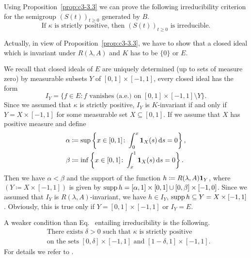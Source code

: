 \begin{examples}
\begin{enumerate}[\upshape (i), wide, labelindent=.25em]
	Using Proposition~\ref{prop:c3-3.3} we can prove the following irreducibility criterion for the semigroup $(S(t))_{t\geq 0}$ generated by $B$.
	\begin{equation}\label{eq:c3-3.7}
		\text{If } \kappa \text{ is strictly positive, then } (S(t))_{t\geq 0} \text{ is irreducible.}
	\end{equation}
	
	Actually, in view of Proposition~\ref{prop:c3-3.3}, we have to show that a closed ideal which is invariant under $R(\lambda,A)$ and $K$ has to be $\{0\}$ or $E$.
	
	We recall that closed ideals of\/ $E$ are uniquely determined (up to sets of measure zero) by measurable subsets $Y$ of\/ $[0,1]\times[-1,1]$, \ie  every closed ideal has the form
	\[
		I_{Y} = \{f \in E \colon f \text{ vanishes (a.e.) on } [0,1]\times[-1,1] \setminus Y\}.
	\]
	Since we assumed that $\kappa$ is strictly positive, $I_{Y}$ is $K$-invariant if and only if\/ $Y = X\times[-1,1]$ for some measurable set $X \subseteq [0,1]$.
	If we assume that $X$ has positive measure and define
    \begin{align*}
    \alpha & \coloneq \sup\left\{x \in [0,1] \colon \int_{0}^{x} \mathbf{1}_{X}(s)\mathop{}\!\mathrm{d}{s}  = 0\right\}, \\
	 \beta & \coloneq \inf\left\{x \in [0,1] \colon \int_{x}^{1} \mathbf{1}_{X}(s)\mathop{}\!\mathrm{d}{s}  = 0 \right\}.
    \end{align*}
	Then we have $\alpha < \beta$ and the support of the function $h \coloneq R(\lambda,A)\mathbf{1}_{Y}$, where 
	$(Y \coloneq X\times[-1,1])$ is given by $\mathop{}\!\mathrm{supp}\, h = [\alpha,1]\times[0,1] \cup [0,\beta]\times[-1,0]$.
	Since we assumed that $I_{Y}$ is $R(\lambda,A)$-invariant, we have $h \in I_{Y}$, \ie  $\mathop{}\!\mathrm{supp}\, h \subseteq Y = X\times[-1,1]$.
	Obviously, this is true only if\/ $Y = [0,1]\times[-1,1]$ or $I_{Y} = E$.
	
	A weaker condition than Eq.~ entailing irreducibility is the following.
	\begin{equation}\label{eq:c3-3.8}
		\begin{split}
		&\text{There exists } \delta > 0 \text{ such that } \kappa \text{ is strictly positive}\\
		&\text{on the sets } [0,\delta]\times[-1,1] \text{ and } [1-\delta,1]\times[-1,1] .
		\end{split}
	\end{equation}
	For details we refer to \textcite{greiner:1984d}.
	\end{enumerate}	
\end{examples}
